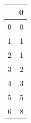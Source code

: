 \begin{tabular}{lr}
\toprule
{} &  0 \\
\midrule
0 &  0 \\
1 &  1 \\
2 &  1 \\
3 &  2 \\
4 &  3 \\
5 &  5 \\
6 &  8 \\
\bottomrule
\end{tabular}
